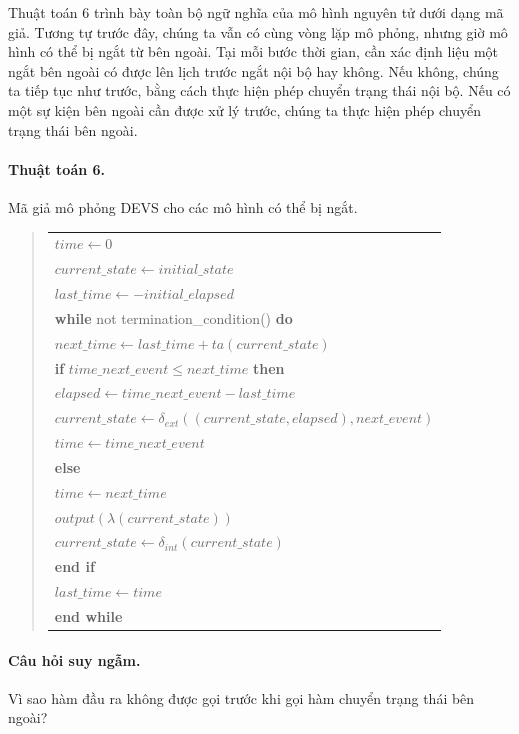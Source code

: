 Thuật toán 6 trình bày toàn bộ ngữ nghĩa của mô hình nguyên tử dưới dạng mã giả. Tương tự trước đây, chúng ta vẫn có cùng vòng lặp mô phỏng, nhưng giờ mô hình có thể bị ngắt từ bên ngoài. Tại mỗi bước thời gian, cần xác định liệu một ngắt bên ngoài có được lên lịch trước ngắt nội bộ hay không. Nếu không,
chúng ta tiếp tục như trước, bằng cách thực hiện phép chuyển trạng thái nội bộ. Nếu có một sự kiện bên ngoài cần được xử lý trước, chúng ta thực hiện phép chuyển trạng thái bên ngoài.

\begin{samepage}
\paragraph{Thuật toán 6.} Mã giả mô phỏng DEVS cho các mô hình có thể bị ngắt.
\begin{quote}
\begin{tabular}{l}
$time\leftarrow0$\\
$current\_state\leftarrow initial\_state$\\
$last\_time\leftarrow-initial\_elapsed$\\
\textbf{while} not termination\_condition() \textbf{do}\\
\quad $next\_time\leftarrow last\_time+ta(current\_state)$\\
\quad \textbf{if} $time\_next\_event\leq next\_time$ \textbf{then}\\
\qquad $elapsed\leftarrow time\_next\_event-last\_time$\\
\qquad $current\_state\leftarrow\delta_{ext}((current\_state,elapsed),next\_event)$\\
\qquad $time\leftarrow time\_next\_event$\\
\quad \textbf{else}\\
\qquad $time\leftarrow next\_time$\\
\qquad $output(\lambda(current\_state))$\\
\qquad $current\_state\leftarrow\delta_{int}(current\_state)$\\
\quad \textbf{end if}\\
\quad $last\_time\leftarrow time$\\
\textbf{end while}
\end{tabular}
\end{quote}
\end{samepage}

\paragraph{Câu hỏi suy ngẫm.} Vì sao hàm đầu ra không được gọi trước khi gọi hàm chuyển trạng thái bên ngoài?

